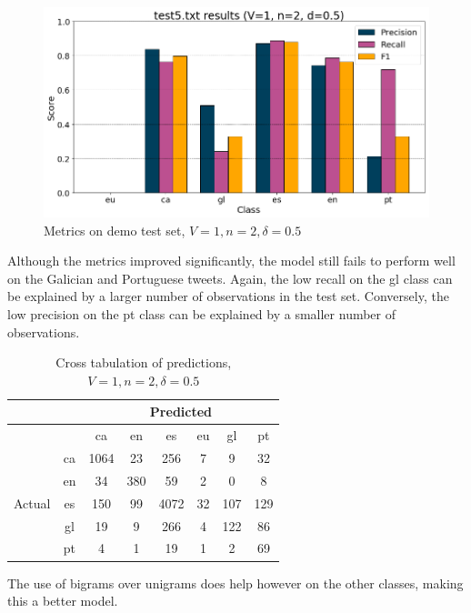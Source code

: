 \documentclass[runningheads]{llncs}
\begin{document}
\begin{figure}
    \begin{center}
        \includegraphics[width=12.5cm]{images/test5_results_1_2_0-5.png}
        \caption{Metrics on demo test set, $V=1, n=2, \delta=0.5$}
        \label{fig:demo_1_2_0.5}
    \end{center}
\end{figure}

Although the metrics improved significantly, the model still fails to perform well on the Galician and Portuguese tweets. Again, the low recall on the gl class can be explained by a larger number of observations in the test set. Conversely, the low precision on the pt class can be explained by a smaller number of observations.

\begin{table}
	\centering
	\caption{Cross tabulation of predictions, $V=1, n=2, \delta=0.5$}
	\label{tab:demo_confusion_1_2_0.5}
	\begin{tabular}{|c|c|c|c|c|c|c|c|} \hline
	    & & \multicolumn{6}{c|}{Predicted} \\ \hline
		& &    ca &   en &    es &  eu &   gl &   pt \\ \hline
		\multirow{6}{*}{Actual} & ca   &  1064 &   23 &   256 &   7 &    9 &   32 \\
		& en   &    34 &  380 &    59 &   2 &    0 &    8 \\
		& es   &   150 &   99 &  4072 &  32 &  107 &  129 \\
		& gl   &    19 &    9 &   266 &   4 &  122 &   86 \\
		& pt   &     4 &    1 &    19 &   1 &    2 &   69 \\ \hline
	\end{tabular}
\end{table}

The use of bigrams over unigrams does help however on the other classes, making this a better model.
\end{document}
